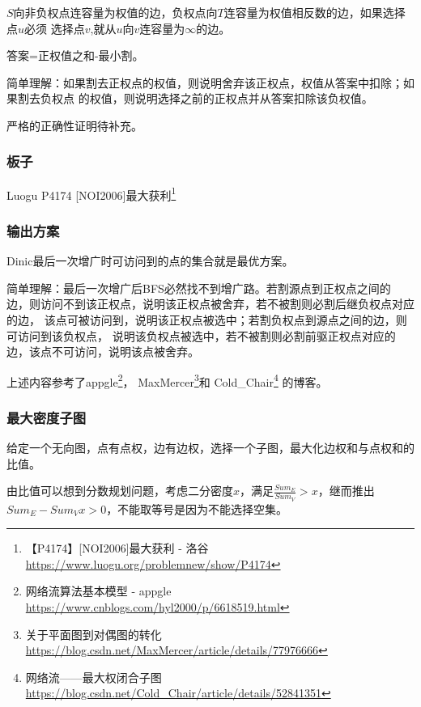 $S$向非负权点连容量为权值的边，负权点向$T$连容量为权值相反数的边，如果选择点$u$必须
选择点$v$,就从$u$向$v$连容量为$\infty$的边。

答案=正权值之和-最小割。

简单理解：如果割去正权点的权值，则说明舍弃该正权点，权值从答案中扣除；如果割去负权点
的权值，则说明选择之前的正权点并从答案扣除该负权值。

严格的正确性证明待补充。

\subsubsection{板子}

Luogu P4174 [NOI2006]最大获利\footnote{【P4174】[NOI2006]最大获利 - 洛谷
\url{https://www.luogu.org/problemnew/show/P4174}}



\subsubsection{输出方案}

\begin{theorem}
    Dinic最后一次增广时可访问到的点的集合就是最优方案。
\end{theorem}

简单理解：最后一次增广后BFS必然找不到增广路。若割源点到正权点之间的
边，则访问不到该正权点，说明该正权点被舍弃，若不被割则必割后继负权点对应的边，
该点可被访问到，说明该正权点被选中；若割负权点到源点之间的边，则可访问到该负权点，
说明该负权点被选中，若不被割则必割前驱正权点对应的边，该点不可访问，说明该点被舍弃。

上述内容参考了appgle\footnote{网络流算法基本模型 - appgle
	\url{https://www.cnblogs.com/hyl2000/p/6618519.html}}，
MaxMercer\footnote{关于平面图到对偶图的转化 \\
	\url{https://blog.csdn.net/MaxMercer/article/details/77976666}}和
Cold\_Chair\footnote{网络流——最大权闭合子图 \\
	\url{https://blog.csdn.net/Cold\_Chair/article/details/52841351}}
的博客。

\subsubsection{最大密度子图}
给定一个无向图，点有点权，边有边权，选择一个子图，最大化边权和与点权和的比值。

由比值可以想到分数规划问题，考虑二分密度$x$，满足$\frac{Sum_E}{Sum_V}>x$，继而推出
$Sum_E-Sum_Vx>0$，不能取等号是因为不能选择空集。

